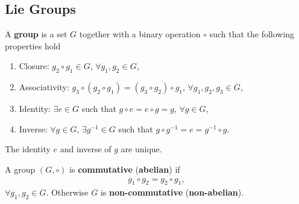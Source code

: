 \subsection{Lie Groups}

\begin{definition}
    A \textbf{group} is a set $G$ together with a binary operation $\circ$ such that the following properties hold
    \begin{enumerate}[label=\roman*)]
        \item Closure: $g_2 \circ g_1 \in G$, $\forall g_1, g_2 \in G$,
        \item Associativity: $g_3 \circ \left( g_2 \circ g_1 \right) = \left( g_3 \circ g_2 \right)  \circ g_1$, $\forall g_1, g_2, g_3 \in G$,
        \item Identity: $\exists e \in G$ such that $g \circ e = e \circ g = g$, $\forall g \in G$,
        \item Inverse: $\forall g \in G$, $\exists g^{-1} \in G$ such that $g \circ g^{-1} = e = g^{-1} \circ g$.
    \end{enumerate}
\end{definition}

The identity $e$ and inverse of $g$ are unique.

\begin{definition}
    A group $\left( G, \circ \right) $ is \textbf{commutative} (\textbf{abelian}) if
    \begin{align}
        g_1 \circ g_2 = g_2 \circ g_1
    ,\end{align}
    $\forall g_1, g_2 \in G$. Otherwise $G$ is \textbf{non-commutative} (\textbf{non-abelian}).
\end{definition}





